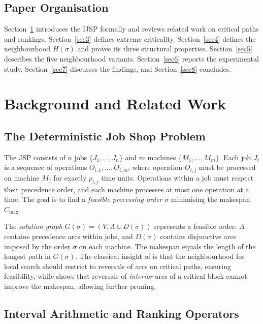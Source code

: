 \documentclass[preprint,12pt]{elsarticle}
\begin{document}
\subsection{Paper Organisation}
\label{sec1.2}
Section~\ref{sec2} introduces the IJSP formally and reviews related work on critical paths and rankings. Section~\ref{sec3} defines extreme criticality. Section~\ref{sec4} defines the neighbourhood $H(\sigma)$ and proves its three structural properties. Section~\ref{sec5} describes the five neighbourhood variants. Section~\ref{sec6} reports the experimental study. Section~\ref{sec7} discusses the findings, and Section~\ref{sec8} concludes.


\section{Background and Related Work}
\label{sec2}

\subsection{The Deterministic Job Shop Problem}
\label{sec2.1}

The JSP consists of $n$ jobs $\{J_1,\ldots,J_n\}$ and $m$ machines $\{M_1,\ldots,M_m\}$. Each job $J_i$ is a sequence of operations $O_{i,1},\ldots,O_{i,m}$, where operation $O_{i,j}$ must be processed on machine $M_j$ for exactly $p_{i,j}$ time units. Operations within a job must respect their precedence order, and each machine processes at most one operation at a time. The goal is to find a \emph{feasible processing order} $\sigma$ minimising the makespan $C_{\max}$.

The \emph{solution graph} $G(\sigma) = (V, A \cup D(\sigma))$ represents a feasible order: $A$ contains precedence arcs within jobs, and $D(\sigma)$ contains disjunctive arcs imposed by the order $\sigma$ on each machine. The makespan equals the length of the longest path in $G(\sigma)$. The classical insight of \cite{vanLaarhoven1992} is that the neighbourhood for local search should restrict to reversals of arcs on critical paths, ensuring feasibility, while \cite{Nowicki1996} shows that reversals of \emph{interior} arcs of a critical block cannot improve the makespan, allowing further pruning.

\subsection{Interval Arithmetic and Ranking Operators}
\label{sec2.2}
\end{document}
